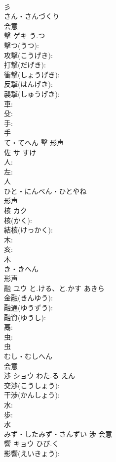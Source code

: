\documentclass[8pt]{extreport}
\begin{document}
\begin{CJK}{UTF8}{min}
\\	彡	
\\	さん・さんづくり	
\\	会意 
\\	撃	ゲキ	う.つ		
\\	撃つ(うつ): 
\\	攻撃(こうげき): 
\\	打撃(だげき): 
\\	衝撃(しょうげき): 
\\	反撃(はんげき): 
\\	襲撃(しゅうげき): 
\\	車: 
\\	殳: 
\\	手: 
\\	手	
\\	て・てへん	擊	形声 
\\	佐	サ		すけ	
\\	人: 
\\	左: 
\\	人	
\\	ひと・にんべん・ひとやね	
\\	形声 
\\	核	カク			
\\	核(かく): 
\\	結核(けっかく): 
\\	木: 
\\	亥: 
\\	木	
\\	き・きへん	
\\	形声 
\\	融	ユウ	と.ける、と.かす	あきら	
\\	金融(きんゆう): 
\\	融通(ゆうずう): 
\\	融資(ゆうし): 
\\	鬲: 
\\	虫: 
\\	虫	
\\	むし・むしへん	
\\	会意 
\\	渉	ショウ	わた.る	えん	
\\	交渉(こうしょう): 
\\	干渉(かんしょう): 
\\	水: 
\\	歩: 
\\	水	
\\	みず・したみず・さんずい	涉	会意 
\\	響	キョウ	ひび.く		
\\	影響(えいきょう): 

\end{CJK}
\end{document}
